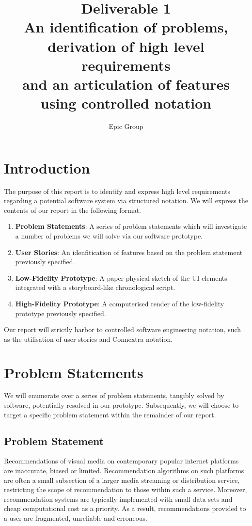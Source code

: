 \documentclass{article}
\begin{document}
\title{%
 Deliverable 1\\
 \large An identification of problems, derivation of high level requirements\\
 \large and an articulation of features using controlled notation
}
\author{Epic Group}
\date{}
\maketitle

\section*{Introduction}
The purpose of this report is to identify and express high level requirements
regarding a potential software system via structured notation. We will express
the contents of our report in the following format.
\begin{enumerate}
\item \textbf{Problem Statements}: A series of problem statements which will
investigate a number of problems we will solve via our software prototype.
\item \textbf{User Stories}: An idenfitication of features based on the problem
statement previously specified.
\item \textbf{Low-Fidelity Prototype}: A paper physical sketch of the UI 
elements integrated with a storyboard-like chronological script.
\item \textbf{High-Fidelity Prototype}: A computerised render of the
low-fidelity prototype previously specified.
\end{enumerate}
Our report will strictly harbor to controlled software engineering notation, 
such as the utilisation of user stories and Connextra notation.
\section{Problem Statements}
We will enumerate over a series of problem statements, tangibly solved by
software, potentially resolved in our prototype. Subsequently, we will choose
to target a specific problem statement within the remainder of our report.
\subsection{Problem Statement}
Recommendations of visual media on contemporary popular internet platforms are
inaccurate, biased or limited. Recommendation algorithms on such platforms are
often a small subsection of a larger media streaming or distribution service, 
restricting the scope of recommendation to those within such a service. Moreover, 
recommendation systems are typically implemented with small data sets and cheap 
computational cost as a priority. As a result, recommendations provided to a 
user are fragmented, unreliable and erroneous.
\end{document}
